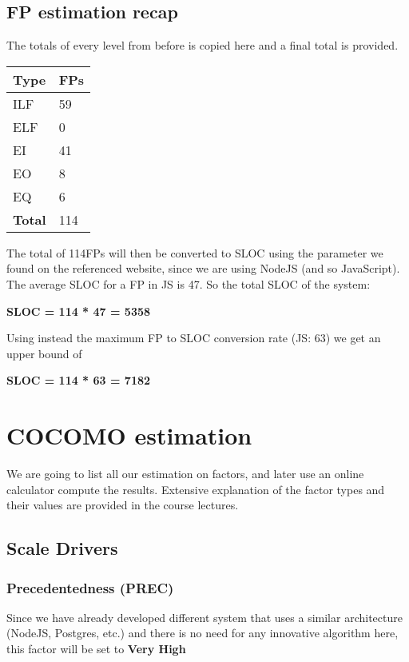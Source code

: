 \subsection{FP estimation recap}
The totals of every level from before is copied here and a final total is provided. 

\begin{center}
    \begin{tabular}{| l | l |}
    \hline
    \textbf{Type} & \textbf{FPs} \\ \hline
    ILF & 59 \\ \hline
    ELF & 0\\ \hline
    EI & 41\\ \hline
    EO & 8\\ \hline
    EQ & 6\\ \hline
    \hline
    \textbf{Total} & 114 \\ \hline
    \end{tabular}
\end{center}

The total of 114FPs will then be converted to SLOC using the parameter we found on the referenced website, since we are using NodeJS (and so JavaScript). The average SLOC for a FP in JS is 47. So the total SLOC of the system:
\bigbreak
\begin{center} \textbf{ SLOC = 114 * 47 = 5358} \end{center}
\bigbreak
Using instead the maximum FP to SLOC conversion rate (JS: 63) we get an upper bound of
\bigbreak
\begin{center} \textbf{ SLOC = 114 * 63 = 7182} \end{center}
\bigbreak

\clearpage
\section{COCOMO estimation}
We are going to list all our estimation on factors, and later use an online calculator compute the results. Extensive explanation of the factor types and their values are provided in the course lectures.
\subsection{Scale Drivers}
\subsubsection{Precedentedness (PREC)}
Since we have already developed different system that uses a similar architecture (NodeJS, Postgres, etc.) and there is no need for any innovative algorithm here, this factor will be set to \textbf{Very High}

